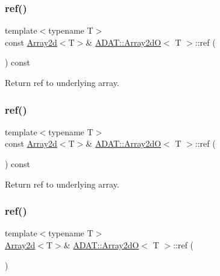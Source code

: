 \subsubsection{\texorpdfstring{ref()}{ref()}\hspace{0.1cm}{\footnotesize\ttfamily [2/6]}}
{\footnotesize\ttfamily template$<$typename T$>$ \\
const \mbox{\hyperlink{classXMLArray_1_1Array2d}{Array2d}}$<$T$>$\& \mbox{\hyperlink{classADAT_1_1Array2dO}{A\+D\+A\+T\+::\+Array2dO}}$<$ T $>$\+::ref (\begin{DoxyParamCaption}{ }\end{DoxyParamCaption}) const\hspace{0.3cm}{\ttfamily [inline]}}



Return ref to underlying array. 

\mbox{\label{classADAT_1_1Array2dO_a376d2e36985a9c05e09bd33244865997}} 
\subsubsection{\texorpdfstring{ref()}{ref()}\hspace{0.1cm}{\footnotesize\ttfamily [3/6]}}
{\footnotesize\ttfamily template$<$typename T$>$ \\
const \mbox{\hyperlink{classXMLArray_1_1Array2d}{Array2d}}$<$T$>$\& \mbox{\hyperlink{classADAT_1_1Array2dO}{A\+D\+A\+T\+::\+Array2dO}}$<$ T $>$\+::ref (\begin{DoxyParamCaption}{ }\end{DoxyParamCaption}) const\hspace{0.3cm}{\ttfamily [inline]}}



Return ref to underlying array. 

\mbox{\label{classADAT_1_1Array2dO_aa409325aa8f61b6f9a6aeeca2746b4cb}} 
\subsubsection{\texorpdfstring{ref()}{ref()}\hspace{0.1cm}{\footnotesize\ttfamily [4/6]}}
{\footnotesize\ttfamily template$<$typename T$>$ \\
\mbox{\hyperlink{classXMLArray_1_1Array2d}{Array2d}}$<$T$>$\& \mbox{\hyperlink{classADAT_1_1Array2dO}{A\+D\+A\+T\+::\+Array2dO}}$<$ T $>$\+::ref (\begin{DoxyParamCaption}{ }\end{DoxyParamCaption})\hspace{0.3cm}{\ttfamily [inline]}}



